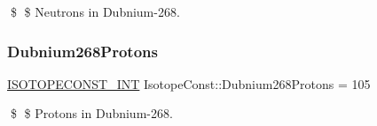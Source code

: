 \$ \$ Neutrons in Dubnium-\/268. \mbox{\label{group___isotope_const-_dubnium-_db268_ga67897f5367833533dc32f01d55655549}} 
\subsubsection{\texorpdfstring{Dubnium268\+Protons}{Dubnium268Protons}}
{\footnotesize\ttfamily \mbox{\hyperlink{group___isotope_const-_macros_ga5f18360b3e99483a35c32d789e62621c}{I\+S\+O\+T\+O\+P\+E\+C\+O\+N\+S\+T\+\_\+\+I\+NT}} Isotope\+Const\+::\+Dubnium268\+Protons = 105}

\$ \$ Protons in Dubnium-\/268. 
